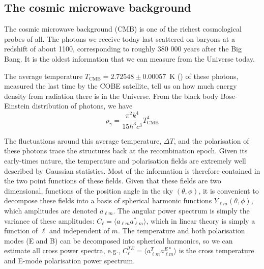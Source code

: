     \subsection{The cosmic microwave background}
    \label{intro:probes:cmb}

    The cosmic microwave background (CMB) is one of the richest cosmological probes of all. 
    The photons we receive today last scattered on baryons at a redshift of about 1100,
    corresponding to roughly 380 000 years after the Big Bang. 
    It is the oldest information 
    that we can measure from the Universe today. 
    
    The average temperature $T_\mathrm{CMB} = 2.72548 \pm 0.00057$~K 
    (\cite{matherMeasurementCosmicMicrowave1994, fixsenTemperatureCosmicMicrowave2009}) 
    of these photons, measured the last time by the COBE satellite, tell us on how much 
    energy density from radiation there is in the Universe. From the black body Bose-Einstein 
    distribution of photons, we have 
    \begin{equation}
        \rho_\gamma = \frac{\pi^2 k^4}{15 \hbar^3 c^3} T_\mathrm{CMB}^4
        \label{eq:energy_density_photons}
    \end{equation} 
    
    The fluctuations around this average temperature, $\Delta T$, 
    and the polarisation of these photons
    trace the structures back at the recombination epoch. 
    Given its early-times nature, 
    the temperature and polarisation fields are extremely well described by 
    Gaussian statistics. Most of the information is therefore contained in the two point
    functions of these fields. Given that these fields are two dimensional, functions of
    the position angle in the sky $(\theta, \phi)$, it is convenient to decompose these 
    fields into a basis of spherical harmonic functions $Y_{\ell m}(\theta, \phi)$, 
    which amplitudes are denoted $a_{\ell m}$. The angular power spectrum  
    is simply the variance of these amplitudes: $C_\ell = \langle a_{\ell m} a^*_{\ell m}\rangle$, 
    which in linear theory is simply a function of $\ell$ and independent of $m$. 
    The temperature and both polarisation modes (E and B) can be decomposed into 
    spherical harmonics, so we can estimate all cross power spectra, e.g., 
    $C^{TE}_\ell = \langle a^T_{\ell m} a^{E*}_{\ell m}\rangle$ is the
    cross temperature and E-mode polarisation power spectrum. 
    
